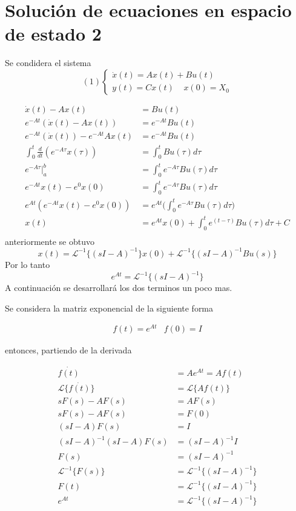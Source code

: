 \section{Solución de ecuaciones en espacio de estado 2}

Se condidera el sistema
\[
    (1)
    \left\{
        \begin{array}{lll}
            \dot{x}(t) = Ax(t) + Bu(t)\\
            y(t) = Cx(t) \;\;\;\;x(0)=X_{0}
        \end{array}
    \right.
\]

\[
    \begin{split}
        \dot{x}(t) -Ax(t) & = Bu(t)\\
        e^{-At} (\dot{x}(t)-Ax(t)) & = e^{-At}Bu(t)\\
        e^{-At} (\dot{x}(t)) - e^{-At}Ax(t) & = e^{-At}Bu(t)\\
        \int_{0}^{t} \frac{d}{dt} (e^{-A\tau}x(\tau)) & = \int_{0}^{t} Bu(\tau)d\tau\\
        e^{-A\tau}\Big|_a^b & = \int_{0}^{t} e^{-A\tau} Bu(\tau)d\tau\\
        e^{-At}x(t) - e^{0}x(0) & = \int_{0}^{t} e^{-A\tau} Bu(\tau)d\tau\\
        e^{At} (e^{-At}x(t) - e^{0}x(0)) & = e^{At} \Big(\int_{0}^{t} e^{-A\tau} Bu(\tau)d\tau\Big)\\
        x(t) & = e^{At}x(0) + \int_{0}^{t} e^{(t-\tau)}Bu(\tau)d\tau + C\\
    \end{split}
\]
anteriormente se obtuvo
\[
    x(t) = \mathcal{L}^{-1} \{ (sI-A)^{-1} \} x(0) + \mathcal{L}^{-1} \{ (sI-A)^{-1}Bu(s) \}
\]
Por lo tanto
\[
    e^{At} = \mathcal{L}^{-1} \{ (sI-A)^{-1} \}
\]
A continuación se desarrollará los dos terminos un poco mas.

Se considera la matriz exponencial de la siguiente forma 

\[
    \begin{matrix}
        f(t)=e^{At} & f(0)=I
    \end{matrix}
\]

entonces, partiendo de la derivada 

\[
    \begin{split}
        \dot{f(t)} & = Ae^{At} = Af(t)\\
        \mathcal{L} \{ \dot{f(t)} \} & = \mathcal{L} \{ Af(t) \}\\
        sF(s)-AF(s) & = AF(s)\\
        sF(s)-AF(s) & = F(0)\\
        (sI-A)F(s) & = I\\
        (sI-A)^{-1} (sI-A)F(s) & = (sI-A)^{-1}I\\
        F(s) & = (sI-A)^{-1}\\
        \mathcal{L}^{-1} \{ F(s) \} & = \mathcal{L}^{-1} \{ (sI-A)^{-1} \}\\
        F(t) & = \mathcal{L}^{-1} \{ (sI-A)^{-1} \}\\
        e^{At} & = \mathcal{L}^{-1} \{ (sI-A)^{-1} \}
    \end{split}
\]

